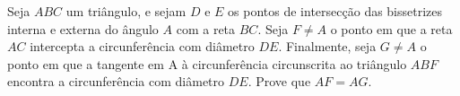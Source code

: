 \begin{questao}
  Seja $ABC$ um triângulo, e sejam $D$ e $E$ os pontos
  de intersecção das bissetrizes interna e externa do ângulo $A$ com
  a reta $BC$. Seja $F \not = A$ o ponto em que a reta $AC$
  intercepta a circunferência com diâmetro $DE$. Finalmente, seja
  $G \not = A$ o ponto em que a tangente em A à circunferência
  circunscrita ao triângulo $ABF$ encontra a circunferência com
  diâmetro $DE$. Prove que $AF = AG$.
\end{questao}

